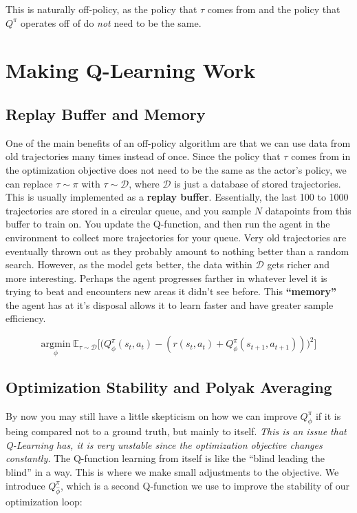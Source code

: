     This is naturally off-policy, as the policy that $\tau$ comes from and the policy that $Q^\pi$ operates off of do \textit{not} need to be the same.

\section{Making Q-Learning Work}
\subsection{Replay Buffer and Memory}
    \large One of the main benefits of an off-policy algorithm are that we can use data from old trajectories many times instead of once. Since the policy that $\tau$ comes from in the optimization objective does not need to be the same as the actor's policy, we can replace $\tau \sim \pi$ with $\tau \sim \mathcal{D}$, where $\mathcal{D}$ is just a database of stored trajectories. This is usually implemented as a \textbf{replay buffer}. Essentially, the last 100 to 1000 trajectories are stored in a circular queue, and you sample $N$ datapoints from this buffer to train on. You update the Q-function, and then run the agent in the environment to collect more trajectories for your queue. Very old trajectories are eventually thrown out as they probably amount to nothing better than a random search. However, as the model gets better, the data within $\mathcal{D}$ gets richer and more interesting. Perhaps the agent progresses farther in whatever level it is trying to beat and encounters new areas it didn't see before. This \textbf{``memory''} the agent has at it's disposal allows it to learn faster and have greater sample efficiency.

    $$\underset{\phi}{\mathrm{argmin}}\;\mathbb{E}_{\tau \sim \mathcal{D}}\biggl[\biggl(Q_\phi^\pi(s_t, a_t) - (r(s_t, a_t) + Q_\phi^\pi(s_{t+1}, a_{t+1}))\biggr)^2\biggr]$$
\subsection{Optimization Stability and Polyak Averaging}
    \large By now you may still have a little skepticism on how we can improve $Q^\pi_\phi$ if it is being compared not to a ground truth, but mainly to itself. \textit{This is an issue that Q-Learning has, it is very unstable since the optimization objective changes constantly.} The Q-function learning from itself is like the ``blind leading the blind'' in a way. This is where we make small adjustments to the objective. We introduce $Q^\pi_{\hat{\phi}}$, which is a second Q-function we use to improve the stability of our optimization loop:

